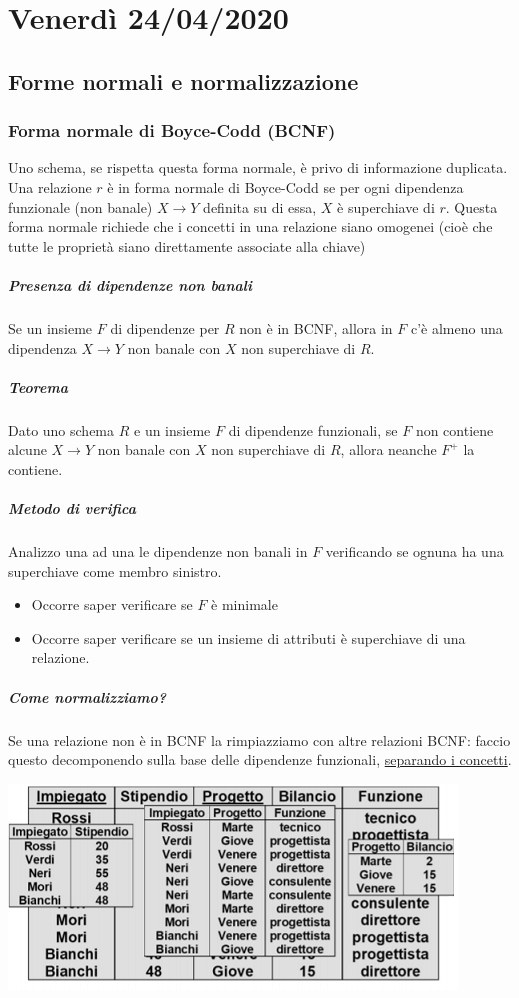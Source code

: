 \chapter{Venerdì 24/04/2020}
\section{Forme normali e normalizzazione}
\subsection{Forma normale di Boyce-Codd (BCNF)}
Uno schema, se rispetta questa forma normale, è privo di informazione duplicata. Una relazione $r$ è in forma normale di Boyce-Codd se per ogni dipendenza funzionale (non banale) $X \to Y$ definita su di essa, $X$ è superchiave di $r$. Questa forma normale richiede che i concetti in una relazione siano omogenei (cioè che tutte le proprietà siano direttamente associate alla chiave)
\paragraph{Presenza di dipendenze non banali} Se un insieme $F$ di dipendenze per $R$ non è in BCNF, allora in $F$ c'è almeno una dipendenza $X \to Y$ non banale con $X$ non superchiave di $R$.
\paragraph{Teorema} Dato uno schema $R$ e un insieme $F$ di dipendenze funzionali, se $F$ non contiene alcune $X \to Y$ non banale con $X$ non superchiave di $R$, allora neanche $F^+$ la contiene.
\paragraph{Metodo di verifica} Analizzo una ad una le dipendenze non banali in $F$ verificando se ognuna ha una superchiave come membro sinistro.
\begin{itemize}
	\item Occorre saper verificare se $F$ è minimale
	\item Occorre saper verificare se un insieme di attributi è superchiave di una relazione.
\end{itemize}
\paragraph{Come normalizziamo?} Se una relazione non è in BCNF la rimpiazziamo con altre relazioni BCNF: faccio questo decomponendo sulla base delle dipendenze funzionali, \underline{separando i concetti}.
\begin{center}
	\includegraphics{images/142.PNG}
\end{center}
